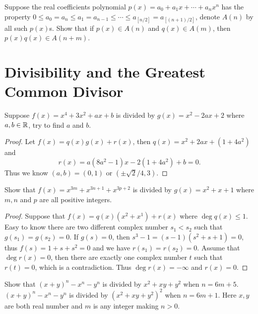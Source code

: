 \begin{pro}%
	Suppose the real coefficients polynomial $p(x)=a_0+a_1x+\cdots+a_nx^n$ has the property $0\leq a_0=a_n\leq a_1=a_{n-1}\leq\cdots\leq a_{[n/2]}=a_{[(n+1)/2]}$, denote $A(n)$ by all such $p(x)$s. Show that if $p(x)\in A(n)$ and $q(x)\in A(m)$, then $p(x)q(x)\in A(n+m)$.
\end{pro}

\section{Divisibility and the Greatest Common Divisor}
\begin{pro}%
	Suppose $f(x)=x^4+3x^2+ax+b$ is divided by $g(x)=x^2-2ax+2$ where $a,b\in\mathbb{R}$, try to find $a$ and $b$.
\end{pro}
\begin{proof}
	Let $f(x)=q(x)g(x)+r(x)$, then $q(x)=x^2+2ax+(1+4a^2)$ and
	\[r(x)=a(8a^2-1)x-2(1+4a^2)+b=0.\]
	Thus we know $(a,b)=(0,1)$ or $(\pm \sqrt{2}/4,3)$.
\end{proof}

\begin{pro}%
	Show that $f(x)=x^{3m}+x^{3n+1}+x^{3p+2}$ is divided by $g(x)=x^2+x+1$ where $m,n$ and $p$ are all positive integers.
\end{pro}
\begin{proof}
	Suppose that $f(x)=q(x)(x^2+x^1)+r(x)$ where $\deg q(x)\leq 1$. Easy to know there are two different complex number $s_1<s_2$ such that $g(s_1)=g(s_2)=0$. If $g(s)=0$, then $s^3-1=(s-1)(s^2+s+1)=0$, thus $f(s)=1+s+s^2=0$ and we have $r(s_1)=r(s_2)=0$. Assume that $\deg r(x)=0$, then there are exactly one complex number $t$ such that $r(t)=0$, which is a contradiction. Thus $\deg r(x)=-\infty$ and $r(x)=0$.
\end{proof}

\begin{pro}%
	Show that $(x+y)^n-x^n-y^n$ is divided by $x^2+xy+y^2$ when $n=6m+5$. $(x+y)^n-x^n-y^n$ is divided by $(x^2+xy+y^2)^2$ when $n=6m+1$. Here $x,y$ are both real number and $m$ is any integer making $n>0$.
\end{pro}

